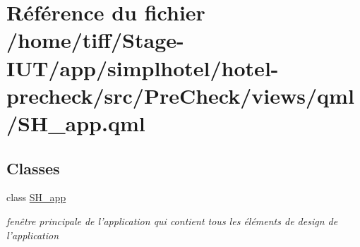 \hypertarget{SH__app_8qml}{\section{Référence du fichier /home/tiff/\-Stage-\/\-I\-U\-T/app/simplhotel/hotel-\/precheck/src/\-Pre\-Check/views/qml/\-S\-H\-\_\-app.qml}
\label{SH__app_8qml}
}
\subsection*{Classes}
\begin{DoxyCompactItemize}
\item 
class \hyperlink{classSH__app}{S\-H\-\_\-app}
\begin{DoxyCompactList}\small\item\em fenêtre principale de l'application qui contient tous les éléments de design de l'application \end{DoxyCompactList}\end{DoxyCompactItemize}
